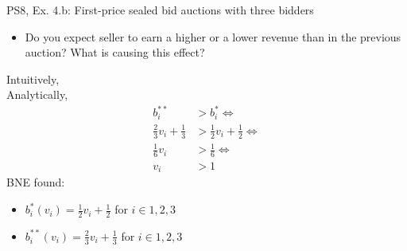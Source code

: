 \begin{frame}{PS8, Ex. 4.b: First-price sealed bid auctions with three bidders}
    \begin{itemize}
      \item[(b)] Do you expect seller to earn a higher or a lower revenue than in the previous auction? What is causing this effect?
    \end{itemize}
    \vspace{-8pt}
    \begin{multicols}{2}
    Intuitively, \\\medskip
    Analytically, 
    \begin{align*}
      b_i^{**}&>b_i^{*}\Leftrightarrow\\
      \frac{2}{3}v_i+\frac{1}{3}&>\frac{1}{2}v_i+\frac{1}{2}\Leftrightarrow\\
      \frac{1}{6}v_i&>\frac{1}{6}\Leftrightarrow\\
                 v_i&>1
    \end{align*}
    \vfill\null\columnbreak
    BNE found:
    \begin{itemize}
      \item[(3.a)] $b_i^{*}(v_i)=\frac{1}{2}v_i+\frac{1}{2}$ for $i\in1,2,3$
      \item[(4.a)] $b_i^{**}(v_i)=\frac{2}{3}v_i+\frac{1}{3}$ for $i\in1,2,3$
    \end{itemize}
    \vfill\null
    \end{multicols}
\end{frame}


